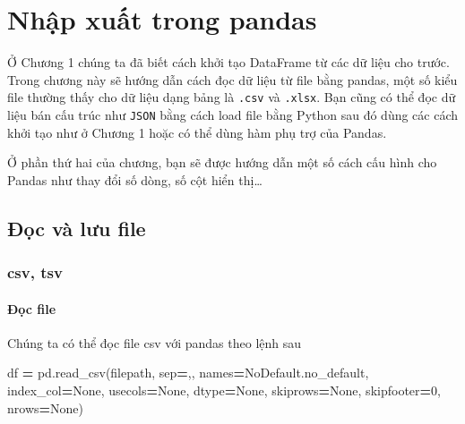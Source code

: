 \documentclass[
]{book}
\newenvironment{Shaded}{\begin{snugshade}}{\end{snugshade}}
\newcommand{\DecValTok}[1]{\textcolor[rgb]{0.00,0.00,0.81}{#1}}
\newcommand{\NormalTok}[1]{#1}
\newcommand{\OperatorTok}[1]{\textcolor[rgb]{0.81,0.36,0.00}{\textbf{#1}}}
\newcommand{\StringTok}[1]{\textcolor[rgb]{0.31,0.60,0.02}{#1}}
\newcommand{\VariableTok}[1]{\textcolor[rgb]{0.00,0.00,0.00}{#1}}
\begin{document}
\hypertarget{nhux1eadp-xuux1ea5t-trong-pandas}{%
\chapter{Nhập xuất trong pandas}\label{nhux1eadp-xuux1ea5t-trong-pandas}}

Ở Chương 1 chúng ta đã biết cách khởi tạo DataFrame từ các dữ liệu cho trước.
Trong chương này sẽ hướng dẫn cách đọc dữ liệu từ file bằng pandas, một số kiểu file thường thấy cho dữ liệu dạng bảng là \texttt{.csv} và \texttt{.xlsx}.
Bạn cũng có thể đọc dữ liệu bán cấu trúc như \texttt{JSON} bằng cách load file bằng Python sau đó dùng các cách khởi tạo như ở Chương 1 hoặc có thể dùng
hàm phụ trợ của Pandas.

Ở phần thứ hai của chương, bạn sẽ được hướng dẫn một số cách cấu hình cho Pandas như thay đổi số dòng, số cột hiển thị\ldots{}

\hypertarget{ux111ux1ecdc-vuxe0-lux1b0u-file}{%
\section{Đọc và lưu file}\label{ux111ux1ecdc-vuxe0-lux1b0u-file}}

\hypertarget{csv-tsv}{%
\subsection{csv, tsv}\label{csv-tsv}}

\hypertarget{ux111ux1ecdc-file}{%
\subsubsection{Đọc file}\label{ux111ux1ecdc-file}}

Chúng ta có thể đọc file csv với pandas theo lệnh sau

\begin{Shaded}
\begin{Highlighting}[]
\NormalTok{df }\OperatorTok{=}\NormalTok{ pd.read\_csv(filepath, sep}\OperatorTok{=}\StringTok{\textquotesingle{},\textquotesingle{}}\NormalTok{, names}\OperatorTok{=}\NormalTok{NoDefault.no\_default, index\_col}\OperatorTok{=}\VariableTok{None}\NormalTok{, usecols}\OperatorTok{=}\VariableTok{None}\NormalTok{, dtype}\OperatorTok{=}\VariableTok{None}\NormalTok{, skiprows}\OperatorTok{=}\VariableTok{None}\NormalTok{, skipfooter}\OperatorTok{=}\DecValTok{0}\NormalTok{, nrows}\OperatorTok{=}\VariableTok{None}\NormalTok{)}
\end{Highlighting}
\end{Shaded}
\end{document}
